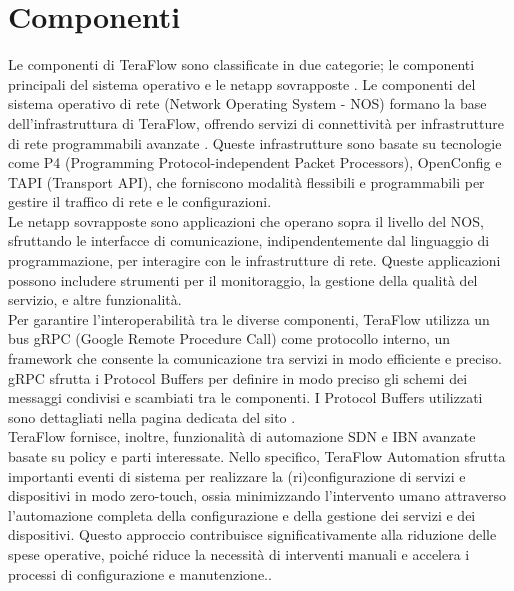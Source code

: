 \section{Componenti}
Le componenti di TeraFlow sono classificate in due categorie; le componenti principali del sistema operativo e le netapp sovrapposte \cite{Component}. 
Le componenti del sistema operativo di rete (Network Operating System - NOS) formano la base dell'infrastruttura di TeraFlow, offrendo servizi di connettività per infrastrutture di rete programmabili avanzate \cite{Component}. %
Queste infrastrutture sono basate su tecnologie come P4 (Programming Protocol-independent Packet Processors), OpenConfig e TAPI (Transport API), che forniscono modalità flessibili e programmabili per gestire il traffico di rete e le configurazioni.
\\Le netapp sovrapposte sono applicazioni che operano sopra il livello del NOS, sfruttando le interfacce di comunicazione, indipendentemente dal linguaggio di programmazione, per interagire con le infrastrutture di rete.
Queste applicazioni possono includere strumenti per il monitoraggio, la gestione della qualità del servizio, e altre funzionalità.
\\Per garantire l'interoperabilità tra le diverse componenti, TeraFlow utilizza un bus gRPC (Google Remote Procedure Call) come protocollo interno, 
un framework che consente la comunicazione tra servizi in modo efficiente e preciso. 
gRPC sfrutta i Protocol Buffers per definire in modo preciso gli schemi dei messaggi condivisi e scambiati tra le componenti. %
I Protocol Buffers utilizzati sono dettagliati nella pagina dedicata del sito \cite{ProtoBuf}.
\\TeraFlow fornisce, inoltre, funzionalità di automazione SDN e IBN avanzate basate su policy e parti interessate. Nello specifico, TeraFlow Automation sfrutta 
importanti eventi di sistema per realizzare la (ri)configurazione di servizi e dispositivi in modo zero-touch, ossia minimizzando l'intervento umano attraverso l'automazione completa della configurazione e della gestione dei servizi e dei dispositivi.
Questo approccio contribuisce significativamente alla riduzione delle spese operative, poiché riduce la necessità di interventi manuali e accelera i processi di configurazione e manutenzione.\cite{Component}.
